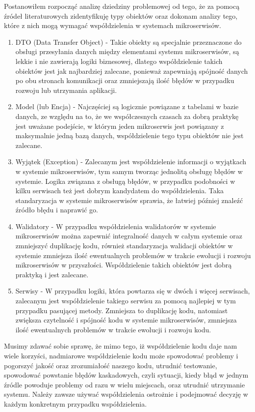 \documentclass[runningheads,12pt]{llncs}
\begin{document}
Postanowiłem rozpocząć analizę dziedziny problemowej od tego, że za pomocą źródeł literaturowych zidentyfikuję typy obiektów oraz dokonam analizy tego, które z nich mogą wymagać współdzielenia w systemach mikroserwisów.

\begin{enumerate}
    \item DTO (Data Transfer Object) - Takie obiekty są specjalnie przeznaczone do obsługi przesyłania danych między elementami systemu mikroserwisów, są lekkie i nie zawierają logiki biznesowej, dlatego współdzielenie takich obiektów jest jak najbardziej zalecane, ponieważ zapewniają spójność danych po obu stronach komunikacji oraz zmniejszają ilość błędów w przypadku rozwoju lub utrzymania aplikacji.
    \item Model (lub Encja) - Najczęściej są logicznie powiązane z tabelami w bazie danych, ze względu na to, że we współczesnych czasach za dobrą praktykę jest uważane podejście, w którym jeden mikroserwis jest powiązany z maksymalnie jedną bazą danych, współdzielenie tego typu obiektów nie jest zalecane.
    \item Wyjątek (Exception) - Zalecanym jest współdzielenie informacji o wyjątkach w systemie mikroserwisów, tym samym tworząc jednolitą obsługę błędów w systemie. Logika związana z obsługą błędów, w przypadku podobności w kilku serwisach też jest dobrym kandydatem do współdzielenia. Taka standaryzacja w systemie mikroserwisów sprawia, że łatwiej później znaleźć źródło błędu i naprawić go.
    \item Walidatory - W przypadku współdzielenia walidatorów w systemie mikroserwisów można zapewnić integralność danych w całym systemie oraz zmniejszyć duplikację kodu, również standaryzacja walidacji obiektów w systemie zmniejsza ilość ewentualnych problemów w trakcie ewolucji i rozwoju mikroserwisów w przyszłości. Współdzielenie takich obiektów jest dobrą praktyką i jest zalecane.
    \item Serwisy - W przypadku logiki, która powtarza się w dwóch i więcej serwisach, zalecanym jest współdzielenie takiego serwisu za pomocą najlepiej w tym przypadku pasującej metody. Zmniejsza to duplikację kodu, natomiast zwiększa czytelność i spójność kodu w systemie mikroserwisów, zmniejsza ilość ewentualnych problemów w trakcie ewolucji i rozwoju kodu.
\end{enumerate}

Musimy zdawać sobie sprawę, że mimo tego, iż współdzielenie kodu daje nam wiele korzyści, nadmiarowe współdzielenie kodu może spowodować problemy i pogorszyć jakość oraz zrozumiałość naszego kodu, utrudnić testowanie, spowodować powstanie błędów kaskadowych, czyli sytuacji, kiedy błąd w jednym źródle powoduje problemy od razu w wielu miejscach, oraz utrudnić utrzymanie systemu. Należy zawsze używać współdzielenia ostrożnie i podejmować decyzję w każdym konkretnym przypadku współdzielenia.
\end{document}
